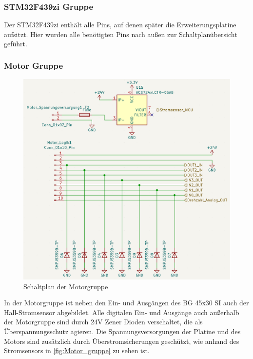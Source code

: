 \subsubsection{STM32F439zi Gruppe}
Der STM32F439zi enthält alle Pins, auf denen später die Erweiterungsplatine aufsitzt. Hier wurden alle benötigten Pins nach außen zur Schaltplanübersicht geführt.
\subsubsection{Motor Gruppe}
\begin{figure}[H]
	\centering
	\includegraphics[width=1.0\textwidth]{images/Hardware/Motor_Schaltplan.PNG}
	\caption{Schaltplan der Motorgruppe}
	\label{fig:Motor_gruppe}
\end{figure}
In der Motorgruppe ist neben den Ein- und Ausgängen des BG 45x30 SI auch der Hall-Stromsensor abgebildet. Alle digitalen Ein- und Ausgänge auch außerhalb der Motorgruppe sind durch 24V Zener Dioden verschaltet, die als Überspannungsschutz agieren. Die Spannungsversorgungen der Platine und des Motors sind zusätzlich durch Überstromsicherungen geschützt, wie anhand des Stromsensors in \autoref{fig:Motor_gruppe} zu sehen ist.
